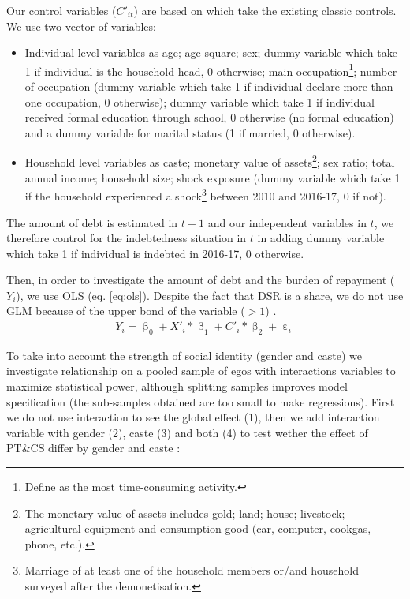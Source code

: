 \documentclass[a4paper, 11pt, onecolumn]{article}
\begin{document}
Our control variables ($C'_{it}$) are based on \cite{Reboul2021, Brown2014, Chichaibelu2017} which take the existing classic controls. 
We use two vector of variables:
\begin{itemize}
\item Individual level variables as age; age square; sex; dummy variable which take 1 if individual is the household head, 0 otherwise; main occupation\footnote{Define as the most time-consuming activity.}; number of occupation (dummy variable which take 1 if individual declare more than one occupation, 0 otherwise); dummy variable which take 1 if individual received formal education through school, 0 otherwise (no formal education) and a dummy variable for marital status (1 if married, 0 otherwise). 
\item Household level variables as caste; monetary value of assets\footnote{The monetary value of assets includes gold; land; house; livestock; agricultural equipment and consumption good (car, computer, cookgas, phone, etc.).}; sex ratio; total annual income; household size; shock exposure (dummy variable which take 1 if the household experienced a shock\footnote{Marriage of at least one of the household members or/and household surveyed after the demonetisation.} between 2010 and 2016-17, 0 if not). 
\end{itemize}
The amount of debt is estimated in $t+1$ and our independent variables in $t$, we therefore control for the indebtedness situation in $t$ in adding dummy variable which take 1 if individual is indebted in 2016-17, 0 otherwise.

Then, in order to investigate the amount of debt and the burden of repayment ($Y_{i}$), we use OLS (eq. \ref{eq:ols}).
Despite the fact that DSR is a share, we do not use GLM because of the upper bond of the variable ($>1$) \citep{Cook2008}.
\begin{equation}\label{eq:ols}
\begin{split}
Y_{i}=\upbeta_{0}+X'_{i}*\upbeta_{1}+C'_{i}*\upbeta_{2}+\upepsilon_i
\end{split}
\end{equation}

To take into account the strength of social identity (gender and caste) we investigate relationship on a pooled sample of egos with interactions variables to maximize statistical power, although splitting samples improves model specification (the sub-samples obtained are too small to make regressions).
First we do not use interaction to see the global effect (1), then we add interaction variable with gender (2), caste (3) and both (4) to test wether the effect of PT\&CS differ by gender and caste :
\end{document}
